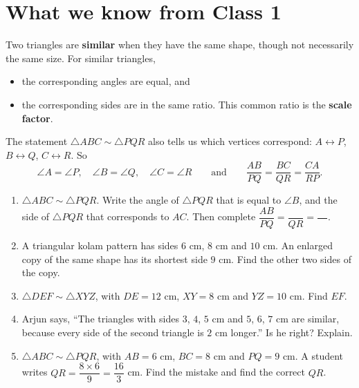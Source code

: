 \documentclass[11pt,a4paper]{article}
\theoremstyle{brand}
\theoremstyle{branddef}
\newcommand{\tr}{\triangle}
\newenvironment{exercise}[1]
  {\par\medskip\Needspace{7\baselineskip}\noindent{\large\bfseries\color{accent}Exercise #1}
   \par\smallskip
   \begin{enumerate}[leftmargin=*,itemsep=4pt]}
  {\end{enumerate}}
\begin{document}
\section{What we know from Class 1}

Two triangles are \textbf{similar} when they have the same shape, though not necessarily the same size. For similar triangles,
\begin{itemize}[leftmargin=1.8em,itemsep=1pt]
  \item the corresponding angles are equal, and
  \item the corresponding sides are in the same ratio. This common ratio is the \textbf{scale factor}.
\end{itemize}

The statement $\tr ABC\sim\tr PQR$ also tells us which vertices correspond: $A\leftrightarrow P$, $B\leftrightarrow Q$, $C\leftrightarrow R$. So
\[
\angle A=\angle P,\quad \angle B=\angle Q,\quad \angle C=\angle R
\qquad\text{and}\qquad
\dfrac{AB}{PQ}=\dfrac{BC}{QR}=\dfrac{CA}{RP}.
\]

\begin{exercise}{2A}
  \item $\tr ABC\sim\tr PQR$. Write the angle of $\tr PQR$ that is equal to $\angle B$, and the side of $\tr PQR$ that corresponds to $AC$. Then complete $\dfrac{AB}{PQ}=\dfrac{\quad}{QR}=\dfrac{\quad}{\quad}$.
  \item A triangular kolam pattern has sides $6$ cm, $8$ cm and $10$ cm. An enlarged copy of the same shape has its shortest side $9$ cm. Find the other two sides of the copy.
  \item $\tr DEF\sim\tr XYZ$, with $DE=12$ cm, $XY=8$ cm and $YZ=10$ cm. Find $EF$.
  \item Arjun says, ``The triangles with sides $3$, $4$, $5$ cm and $5$, $6$, $7$ cm are similar, because every side of the second triangle is $2$ cm longer.'' Is he right? Explain.
  \item $\tr ABC\sim\tr PQR$, with $AB=6$ cm, $BC=8$ cm and $PQ=9$ cm. A student writes
  $QR=\dfrac{8\times6}{9}=\dfrac{16}{3}$ cm. Find the mistake and find the correct $QR$.
\end{exercise}
\end{document}
